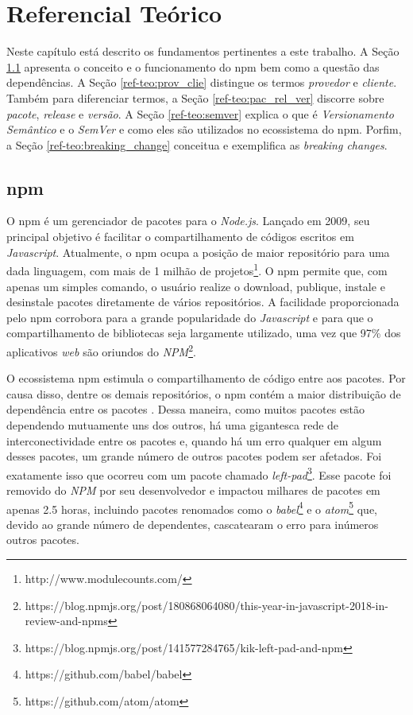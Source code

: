 \chapter{Referencial Teórico}
\label{cap:ref-teorico}
Neste capítulo está descrito os fundamentos pertinentes a este trabalho. A Seção \ref{ref-teo:npm} apresenta o conceito e o funcionamento do \gls{npm} bem como a questão das dependências. A Seção \ref{ref-teo:prov_clie} distingue os termos \textit{provedor} e \textit{cliente}. Também para diferenciar termos, a Seção \ref{ref-teo:pac_rel_ver} discorre sobre \textit{pacote}, \textit{release} e \textit{versão}. A Seção \ref{ref-teo:semver} explica o que é \textit{Versionamento Semântico} e o \textit{SemVer} e como eles são utilizados no ecossistema do \gls{npm}. Porfim, a Seção \ref{ref-teo:breaking_change} conceitua e exemplifica as \textit{breaking changes}.

\section{\gls{npm}}
\label{ref-teo:npm}
O \gls{npm} é um gerenciador de pacotes para o \textit{Node.js}. Lançado em 2009, seu principal objetivo é facilitar o compartilhamento de códigos escritos em \textit{Javascript}. Atualmente, o \gls{npm} ocupa a posição de maior repositório para uma dada linguagem, com mais de 1 milhão de projetos\footnote{http://www.modulecounts.com/}. O \gls{npm} permite que, com apenas um simples comando, o usuário realize o download, publique, instale e desinstale pacotes diretamente de vários repositórios. A facilidade proporcionada pelo \gls{npm} corrobora para a grande popularidade do \textit{Javascript} e para que o compartilhamento de bibliotecas seja largamente utilizado, uma vez que 97\% dos aplicativos \textit{web} são oriundos do \textit{NPM}\footnote{https://blog.npmjs.org/post/180868064080/this-year-in-javascript-2018-in-review-and-npms}.

O ecossistema \gls{npm} estimula o compartilhamento de código entre aos pacotes. Por causa disso, dentre os demais repositórios, o \gls{npm} contém a maior distribuição de dependência entre os pacotes \cite{teorical_reference:npm_2}. Dessa maneira, como muitos pacotes estão dependendo mutuamente uns dos outros, há uma gigantesca rede de interconectividade entre os pacotes e, quando há um erro qualquer em algum desses pacotes, um grande número de outros pacotes podem ser afetados. Foi exatamente isso que ocorreu com um pacote chamado \textit{left-pad}\footnote{https://blog.npmjs.org/post/141577284765/kik-left-pad-and-npm}. Esse pacote foi removido do \textit{NPM} por seu desenvolvedor e impactou milhares de pacotes em apenas 2.5 horas, incluindo pacotes renomados como o \textit{babel}\footnote{https://github.com/babel/babel} e o \textit{atom}\footnote{https://github.com/atom/atom} que, devido ao grande número de dependentes, cascatearam o erro para inúmeros outros pacotes.

